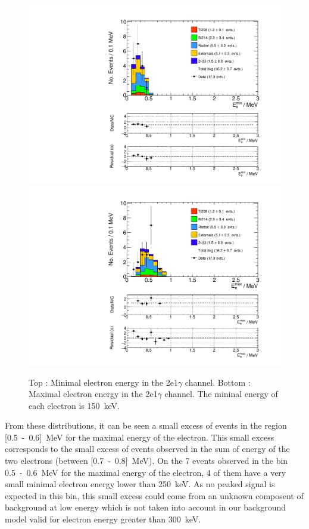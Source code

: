\documentclass[main.tex]{subfiles}
\begin{document}
\begin{figure} [h!]
\begin{center}
\includegraphics[scale=0.5]{pictures/FinalResults/bb2nu2/150/Eemin_bb2nu2NS.pdf}
\includegraphics[scale=0.5]{pictures/FinalResults/bb2nu2/150/Eemax_bb2nu2NS.pdf}
\end{center}
\caption{Top : Minimal electron energy in the 2e1$\gamma$ channel. Bottom : Maximal electron energy in the 2e1$\gamma$ channel. The mininal energy of each electron is 150~keV.}
\label{plot:EeminAndEemax250bb2nu2_150}
\end{figure}


\FloatBarrier


\NI From these distributions, it can be seen a small excess of events in the region [0.5~-~0.6]~MeV for the maximal energy of the electron. This small excess corresponds to the small excess of events observed in the sum of energy of the two electrons (between [0.7~-~0.8]~MeV). On the 7 events observed in the bin 0.5~-~0.6~MeV for the maximal energy of the electron, 4 of them have a very small minimal electron energy lower than 250~keV. As no peaked signal is expected in this bin, this small excess could come from an unknown composent of background at low energy which is not taken into account in our background model valid for electron energy greater than 300~keV. 
\end{document}
